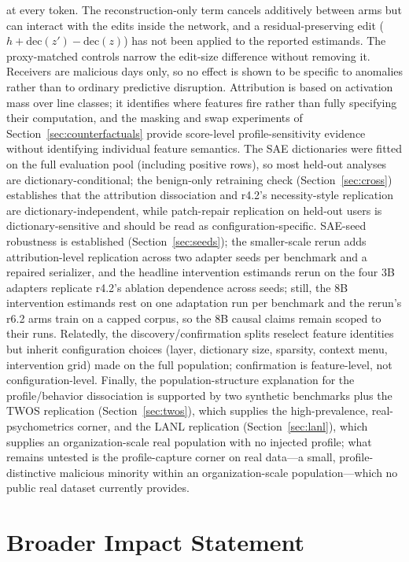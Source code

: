 \documentclass[10pt]{article} %
\newcommand{\rsix}{r6.2}
\newcommand{\rfour}{r4.2}
\begin{document}
at every token. The reconstruction-only term cancels additively between arms
but can interact with the edits inside the network, and a residual-preserving
edit ($h + \mathrm{dec}(z') - \mathrm{dec}(z)$) has not been applied to the
reported estimands. The proxy-matched controls narrow the edit-size
difference without removing it. Receivers are malicious days only, so no
effect is shown to be specific to anomalies rather than to ordinary
predictive disruption. Attribution is based on activation mass over line classes; it identifies
where features fire rather than fully specifying their computation, and the
masking and swap experiments of Section~\ref{sec:counterfactuals} provide score-level
profile-sensitivity evidence without identifying individual feature
semantics. The SAE dictionaries were fitted on the full evaluation pool
(including positive rows), so most held-out analyses are
dictionary-conditional; the benign-only retraining check
(Section~\ref{sec:cross}) establishes that the attribution dissociation and
\rfour{}'s necessity-style replication are dictionary-independent, while
patch-repair replication on held-out users is dictionary-sensitive and
should be read as configuration-specific. SAE-seed robustness is established
(Section~\ref{sec:seeds}); the smaller-scale rerun adds attribution-level
replication across two adapter seeds per benchmark and a repaired
serializer, and the headline intervention estimands rerun on the four 3B
adapters replicate \rfour{}'s ablation dependence across seeds; still, the
8B intervention estimands rest on one adaptation run per benchmark and the
rerun's \rsix{} arms train on a capped corpus, so the 8B causal claims
remain scoped to their runs. Relatedly, the
discovery/confirmation splits reselect feature identities but inherit
configuration choices (layer, dictionary size, sparsity, context menu,
intervention grid) made on the full population; confirmation is
feature-level, not configuration-level. Finally, the population-structure explanation for
the profile/behavior dissociation is supported by two synthetic benchmarks
plus the TWOS replication (Section~\ref{sec:twos}), which supplies the
high-prevalence, real-psychometrics corner, and the LANL replication
(Section~\ref{sec:lanl}), which supplies an organization-scale real population
with no injected profile; what remains untested is the profile-capture corner
on real data---a small, profile-distinctive malicious minority within an
organization-scale population---which no public real dataset currently
provides.

\section{Broader Impact Statement}
\end{document}
